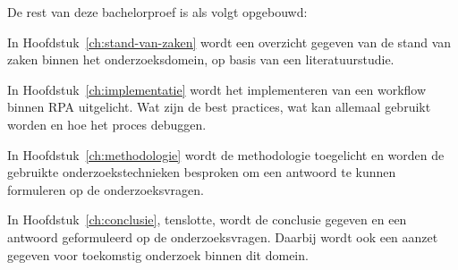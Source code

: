 
De rest van deze bachelorproef is als volgt opgebouwd:

In Hoofdstuk~\ref{ch:stand-van-zaken} wordt een overzicht gegeven van de stand van zaken binnen het onderzoeksdomein, op basis van een literatuurstudie.

In Hoofdstuk~\ref{ch:implementatie} wordt het implementeren van een workflow binnen RPA uitgelicht. Wat zijn de best practices, wat kan allemaal gebruikt worden en hoe het proces debuggen.

In Hoofdstuk~\ref{ch:methodologie} wordt de methodologie toegelicht en worden de gebruikte onderzoekstechnieken besproken om een antwoord te kunnen formuleren op de onderzoeksvragen.

In Hoofdstuk~\ref{ch:conclusie}, tenslotte, wordt de conclusie gegeven en een antwoord geformuleerd op de onderzoeksvragen. Daarbij wordt ook een aanzet gegeven voor toekomstig onderzoek binnen dit domein.